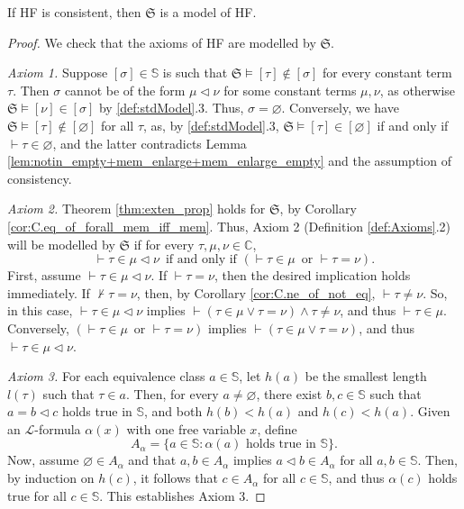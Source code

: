 \begin{theorem}
    \label{thm:stdModel.model_of_consistent}
    \leanok
    If HF is consistent, then $\mathfrak{S}$ is a model of HF.
\end{theorem}

\begin{proof}
    We check that the axioms of HF are modelled by $\mathfrak{S}$.

    \textit{Axiom 1.} Suppose $[\sigma] \in \mathbb{S}$ is such that 
    $\mathfrak{S} \vDash [\tau] \notin [\sigma]$ for every constant term $\tau$.
    Then $\sigma$ cannot be of the form $\mu \lhd \nu$ for some constant terms $\mu, \nu$,
    as otherwise $\mathfrak{S} \vDash [\nu] \in [\sigma]$ by \ref{def:stdModel}.3.
    Thus, $\sigma = \varnothing$.
    Conversely, we have $\mathfrak{S} \vDash [\tau] \notin [\varnothing]$ for all $\tau$,
    as, by \ref{def:stdModel}.3, $\mathfrak{S} \vDash [\tau] \in [\varnothing]$ if and only if
    $\vdash \tau \in \varnothing$, and the latter contradicts 
    Lemma \ref{lem:notin_empty+mem_enlarge+mem_enlarge_empty} and the assumption of consistency.

    \textit{Axiom 2.} Theorem \ref{thm:exten_prop} holds for $\mathfrak{S}$, by 
    Corollary \ref{cor:C.eq_of_forall_mem_iff_mem}.
    Thus, Axiom 2 (Definition \ref{def:Axioms}.2) will be modelled by $\mathfrak{S}$ if 
    for every $\tau,\mu,\nu \in \mathbb{C}$, 
    $$
    \vdash \tau \in \mu \lhd \nu \,\text{ if and only if } 
    (\vdash \tau \in \mu \,\text{ or } \vdash \tau = \nu).
    $$
    First, assume $\vdash \tau \in \mu \lhd \nu$. 
    If $\vdash \tau = \nu$, then the desired implication holds immediately.
    If $\not\vdash \tau = \nu$, then, by Corollary \ref{cor:C.ne_of_not_eq},
    $\vdash \tau \neq \nu$.
    So, in this case, $\vdash \tau \in \mu \lhd \nu$ implies
    $\vdash (\tau \in \mu \lor \tau = \nu) \land \tau \neq \nu$, and thus
    $\vdash \tau \in \mu$. Conversely, 
    $(\vdash \tau \in \mu \,\text{ or } \vdash \tau = \nu)$ implies
    $\vdash (\tau \in \mu \lor \tau = \nu)$, and thus
    $\vdash \tau \in \mu \lhd \nu$.
    
    \textit{Axiom 3.} For each equivalence class $a \in \mathbb{S}$, let $h(a)$ be the smallest
    length $l(\tau)$ such that $\tau \in a$.
    Then, for every $a \neq \varnothing$, there exist $b,c \in \mathbb{S}$ such that 
    $a = b \lhd c$ holds true in $\mathbb{S}$, and both $h(b) < h(a)$ and $h(c) < h(a)$.
    Given an $\mathcal{L}$-formula $\alpha(x)$ with one free variable $x$,
    define 
    $$
    A_\alpha = \{a \in \mathbb{S} : \alpha (a) \text{ holds true in $\mathbb{S}$}\}.
    $$
    Now, assume $\varnothing \in A_\alpha$ and that $a,b \in A_\alpha$ implies 
    $a \lhd b \in A_\alpha$ for all $a,b \in \mathbb{S}$.
    Then, by induction on $h(c)$, it follows that $c \in A_\alpha$ for all $c \in \mathbb{S}$,
    and thus $\alpha(c)$ holds true for all $c \in \mathbb{S}$.
    This establishes Axiom 3.
\end{proof}